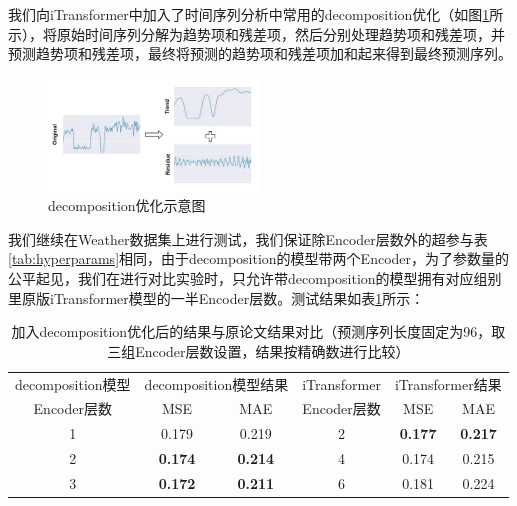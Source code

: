 \documentclass[twoside,12pt]{article}
\begin{document}
我们向iTransformer中加入了时间序列分析中常用的decomposition优化（如图\ref{fig:decomposition}所示），将原始时间序列分解为趋势项和残差项，然后分别处理趋势项和残差项，并预测趋势项和残差项，最终将预测的趋势项和残差项加和起来得到最终预测序列。

\begin{figure}[htbp]
  \centering
  \includegraphics[width=0.5\textwidth]{./pic/decomposition.png}
  \caption{decomposition优化示意图}
  \label{fig:decomposition}
\end{figure}

我们继续在Weather数据集上进行测试，我们保证除Encoder层数外的超参与表\ref{tab:hyperparams}相同，由于decomposition的模型带两个Encoder，为了参数量的公平起见，我们在进行对比实验时，只允许带decomposition的模型拥有对应组别里原版iTransformer模型的一半Encoder层数。测试结果如表\ref{tab:result_decomposition}所示：
\begin{table}[htbp]
  \caption{加入decomposition优化后的结果与原论文结果对比（预测序列长度固定为96，取三组Encoder层数设置，结果按精确数进行比较）}
  \label{tab:result_decomposition}
  \vspace{5pt}
  \centering
  \begin{tabular}{c|cc|c|cc}
    \toprule
    decomposition模型 & \multicolumn{2}{c|}{decomposition模型结果} & iTransformer   & \multicolumn{2}{c}{iTransformer结果}                                   \\
    \cmidrule(lr){2-3} \cmidrule(lr){5-6}
    Encoder层数       & MSE                                        & MAE            & Encoder层数                          & MSE            & MAE            \\
    \midrule
    1                 & 0.179                                      & 0.219          & 2                                    & \textbf{0.177} & \textbf{0.217} \\
    2                 & \textbf{0.174}                             & \textbf{0.214} & 4                                    & 0.174          & 0.215          \\
    3                 & \textbf{0.172}                             & \textbf{0.211} & 6                                    & 0.181          & 0.224          \\
    \bottomrule
  \end{tabular}
\end{table}
\end{document}
